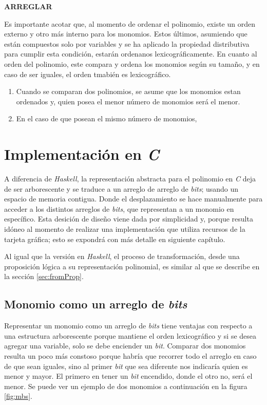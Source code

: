 \textbf{ARREGLAR}

Es importante acotar que, al momento de ordenar el polinomio, existe un orden externo y otro más interno para los monomios. Estos últimos, asumiendo que están compuestos solo por variables y se ha aplicado la propiedad distributiva para cumplir esta condición, estarán ordenanos lexicográficamente. En cuanto al orden del polinomio, este compara y ordena los monomios según su tamaño, y en caso de ser iguales, el orden tmabién es lexicográfico. %

\begin{enumerate}
    \item Cuando se comparan dos polinomios, se asume que los monomios estan ordenados y, quien posea el menor número de monomios será el menor.
    \item En el caso de que posean el mismo número de monomios, 
\end{enumerate}

\section{Implementación en \textit{C}}

A diferencia de \textit{Haskell}, la representación abstracta para el polinomio en \textit{C} deja de ser arborescente y se traduce a un arreglo de arreglo de \textit{bits}; usando un espacio de memoria contigua. Donde el desplazamiento se hace manualmente para acceder a los distintos arreglos de \textit{bits}, que representan a un monomio en específico. Esta desición de diseño viene dada por simplicidad y, porque resulta idóneo al momento de realizar una implementación que utiliza recursos de la tarjeta gráfica; esto se expondrá con más detalle en siguiente capítulo.

Al igual que la versión en \textit{Haskell}, el proceso de transformación, desde una proposición lógica a su representación polinomial, es similar al que se describe en la sección \ref{sec:fromProp}.

\subsection{Monomio como un arreglo de \textit{bits}}

Representar un monomio como un arreglo de \textit{bits} tiene ventajas con respecto a una estructura arborescente porque mantiene el orden lexicográfico y si se desea agregar una variable, solo se debe enciender un \textit{bit}. Comparar dos monomios resulta un poco más constoso porque habría que recorrer todo el arreglo en caso de que sean iguales, sino al primer \textit{bit} que sea diferente nos indicaría quien es menor y mayor. El primero en tener un \textit{bit} encendido, donde el otro no, será el menor. Se puede ver un ejemplo de dos monomios a continuación en la figura \ref{fig:mbs}.

